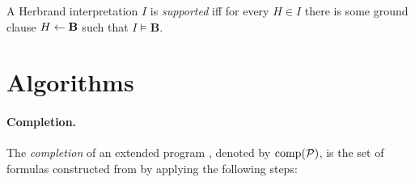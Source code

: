 \begin{dfn}
    A Herbrand interpretation \(I\) is \emph{supported} iff for every \(H \in I\) there is some ground clause \(H \leftarrow \mathbf{B}\) such that \(I \models \mathbf{B}\).
\end{dfn}

\section{Algorithms}

\paragraph{Completion.}
The \emph{completion} of an extended program \prog, denoted by \(\operatorname{comp}(\mathcal{P})\), is the set of formulas constructed from \prog by applying the following steps:
